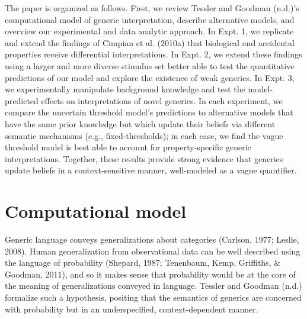 \documentclass[,man,floatsintext]{apa6}
\theoremstyle{definition}
\theoremstyle{definition}
\theoremstyle{definition}
\theoremstyle{remark}
\begin{document}
The paper is organized as follows. First, we review Tessler and Goodman
(n.d.)'s computational model of generic interpretation, describe
alternative models, and overview our experimental and data analytic
approach. In Expt. 1, we replicate and extend the findings of Cimpian et
al. (2010a) that biological and accidental properties receive
differential interpretations. In Expt. 2, we extend these findings using
a larger and more diverse stimulus set better able to test the
quantitative predictions of our model and explore the existence of weak
generics. In Expt. 3, we experimentally manipulate background knowledge
and test the model-predicted effects on interpretations of novel
generics. In each experiment, we compare the uncertain threshold model's
predictions to alternative models that have the same prior knowledge but
which update their beliefs via different semantic mechanisms (e.g.,
fixed-thresholds); in each case, we find the vague threshold model is
best able to account for property-specific generic interpretations.
Together, these results provide strong evidence that generics update
beliefs in a context-sensitive manner, well-modeled as a vague
quantifier.

\hypertarget{computational-model}{%
\section{Computational model}\label{computational-model}}

Generic language conveys generalizations about categories (Carlson,
1977; Leslie, 2008). Human generalization from observational data can be
well described using the language of probability (Shepard, 1987;
Tenenbaum, Kemp, Griffiths, \& Goodman, 2011), and so it makes sense
that probability would be at the core of the meaning of generalizations
conveyed in language. Tessler and Goodman (n.d.) formalize such a
hypothesis, positing that the semantics of generics are concerned with
probability but in an underspecified, context-dependent manner.
\end{document}
